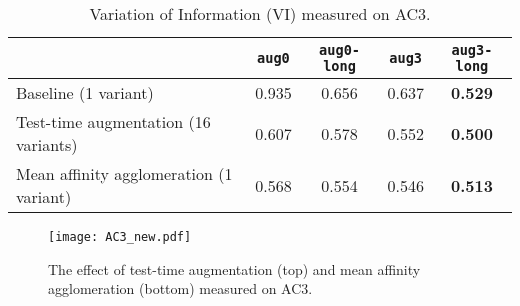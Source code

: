 \documentclass{article}
\begin{document}
\begin{table}[!t]
\caption{Variation of Information (VI) measured on AC3.
\label{tab:AC3}}
\begin{center}
\begin{tabular}{|l|c|c|c|c|}
\hline
 & \texttt{aug0} & \texttt{aug0-long} & \texttt{aug3} & \texttt{aug3-long} \\
\hline
Baseline (1 variant) & 0.935 & 0.656 & 0.637 & \textbf{0.529} \\
Test-time augmentation (16 variants) & 0.607 & 0.578 & 0.552 & \textbf{0.500} \\
Mean affinity agglomeration (1 variant) & 0.568 & 0.554 & 0.546 & \textbf{0.513} \\
\hline
\end{tabular}
\end{center}
\end{table}

%

\begin{figure}
\begin{center}
\texttt{[image: AC3\_new.pdf]}
\end{center}

\caption{The effect of test-time augmentation (top) and mean affinity
agglomeration (bottom) measured on AC3.}

\label{fig:AC3}
\end{figure}
\end{document}
